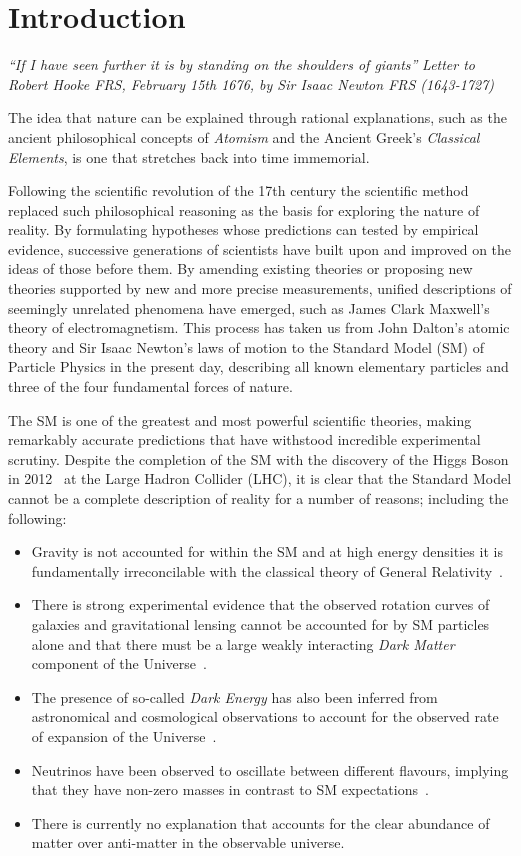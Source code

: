 \chapter{Introduction}\label{chapter:intro}

\emph{``If I have seen further it is by standing on the shoulders of giants''}
\emph{Letter to Robert Hooke FRS, February 15th 1676, by Sir Isaac Newton FRS (1643-1727)}

The idea that nature can be explained through rational explanations, such as the ancient philosophical concepts of \emph{Atomism} and the Ancient Greek's \emph{Classical Elements}, is one that stretches back into time immemorial.

Following the scientific revolution of the 17th century the scientific method replaced such philosophical reasoning as the basis for exploring the nature of reality.
By formulating hypotheses whose predictions can tested by empirical evidence, successive generations of scientists
have built upon and improved on the ideas of those before them.
By amending existing theories or proposing new theories supported by new and more precise measurements, unified descriptions of seemingly unrelated phenomena have emerged, such as James Clark Maxwell's theory of electromagnetism.
This process has taken us from John Dalton's atomic theory and Sir Isaac Newton's laws of motion to the Standard Model (SM) of Particle Physics in the present day, describing all known elementary particles and three of the four fundamental forces of nature.


The SM is one of the greatest and most powerful scientific theories, making remarkably accurate predictions that have withstood incredible experimental scrutiny.
Despite the completion of the SM with the discovery of the Higgs Boson in 2012~\cite{HiggsCMS,HiggsATLAS} at the Large Hadron Collider (LHC), it is clear that the Standard Model cannot be a complete description of reality for a number of reasons; including the following:
\begin{itemize}
\item Gravity is not accounted for within the SM and at high energy densities it is fundamentally irreconcilable with the classical theory of General Relativity~\cite{}.
\item There is strong experimental evidence that the observed rotation curves of galaxies and gravitational lensing cannot be accounted for by SM particles alone and that there must be a large weakly interacting \emph{Dark Matter} component of the Universe~\cite{Bertone:2004pz}.
\item The presence of so-called \emph{Dark Energy} has also been inferred from astronomical and cosmological observations to account for the observed rate of expansion of the Universe~\cite{Peebles:2002gy}.
\item Neutrinos have been observed to oscillate between different flavours, implying that they have non-zero masses in contrast to SM expectations~\cite{Fukuda:1998mi,Ahmad:2001an}.
\item There is currently no explanation that accounts for the clear abundance of matter over anti-matter in the observable universe.
\end{itemize}


